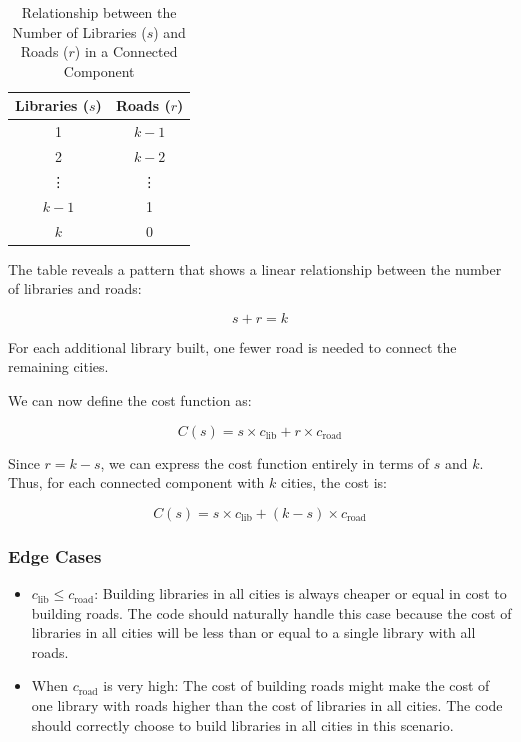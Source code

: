 \documentclass[11pt, a4paper, oneside]{article}
\begin{document}
\begin{table}[H]
  \centering
  \begin{tabular}{|c|c|}
    \hline
    \textbf{Libraries (\( s \))} & \textbf{Roads (\( r \))} \\ \hline
    \rowcolor{green!15} 1 & \( k - 1 \) \\ \hline
    2 & \( k - 2 \) \\ \hline
    \vdots & \vdots \\ \hline
    \( k - 1 \) & 1 \\ \hline
    \rowcolor{green!15} \( k \) & 0 \\ \hline
  \end{tabular}
  \caption{Relationship between the Number of Libraries (\( s \)) and Roads (\( r \)) in a Connected Component}
  \label{tab:libraries-roads}
\end{table}

The table reveals a pattern that shows a linear relationship between the number of libraries and roads:

\[s + r = k\]

For each additional library built, one fewer road is needed to connect the remaining cities.

We can now define the cost function as:

\[
C(s) = s \times c_{\text{lib}} + r \times c_{\text{road}}
\]

Since \( r = k - s \), we can express the cost function entirely in terms of \( s \) and \( k \). Thus, for each connected component with \( k \) cities, the cost is:

\[
C(s) = s \times c_{\text{lib}} + (k - s) \times c_{\text{road}}
\]

\subsubsection*{Edge Cases}

\begin{itemize}
  \item \(c_{\text{lib}} \leq c_{\text{road}}\): Building libraries in all cities is always cheaper or equal in cost to building roads. The code should naturally handle this case because the cost of libraries in all cities will be less than or equal to a single library with all roads.
  \item When \(c_{\text{road}}\) is very high: The cost of building roads might make the cost of one library with roads higher than the cost of libraries in all cities. The code should correctly choose to build libraries in all cities in this scenario.
\end{itemize}
\end{document}

